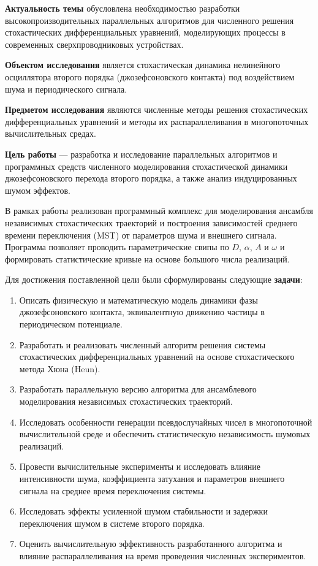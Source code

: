 \textbf{Актуальность темы} обусловлена необходимостью разработки высокопроизводительных параллельных алгоритмов для численного решения стохастических дифференциальных уравнений, моделирующих процессы в современных сверхпроводниковых устройствах.

\textbf{Объектом исследования} является стохастическая динамика нелинейного осциллятора второго порядка (джозефсоновского контакта) под воздействием шума и периодического сигнала.

\textbf{Предметом исследования} являются численные методы решения стохастических дифференциальных уравнений и методы их распараллеливания в многопоточных вычислительных средах.

\textbf{Цель работы} — разработка и исследование параллельных алгоритмов и программных средств численного моделирования стохастической динамики джозефсоновского перехода второго порядка, а также анализ индуцированных шумом эффектов.

В рамках работы реализован программный комплекс для моделирования ансамбля независимых стохастических траекторий и построения зависимостей среднего времени переключения (MST) от параметров шума и внешнего сигнала. Программа позволяет проводить параметрические свипы по $D$, $\alpha$, $A$ и $\omega$ и формировать статистические кривые на основе большого числа реализаций.

Для достижения поставленной цели были сформулированы следующие \textbf{задачи}:
\begin{enumerate}
    \item Описать физическую и математическую модель динамики фазы джозефсоновского контакта, эквивалентную движению частицы в периодическом потенциале.
    
    \item Разработать и реализовать численный алгоритм решения системы стохастических дифференциальных уравнений на основе стохастического метода Хюна (Heun).
    
    \item Разработать параллельную версию алгоритма для ансамблевого моделирования независимых стохастических траекторий.
    
    \item Исследовать особенности генерации псевдослучайных чисел в многопоточной вычислительной среде и обеспечить статистическую независимость шумовых реализаций.
    
    \item Провести вычислительные эксперименты и исследовать влияние интенсивности шума, коэффициента затухания и параметров внешнего сигнала на среднее время переключения системы.
    
    \item Исследовать эффекты усиленной шумом стабильности и задержки переключения шумом в системе второго порядка.
    
    \item Оценить вычислительную эффективность разработанного алгоритма и влияние распараллеливания на время проведения численных экспериментов.
\end{enumerate}

